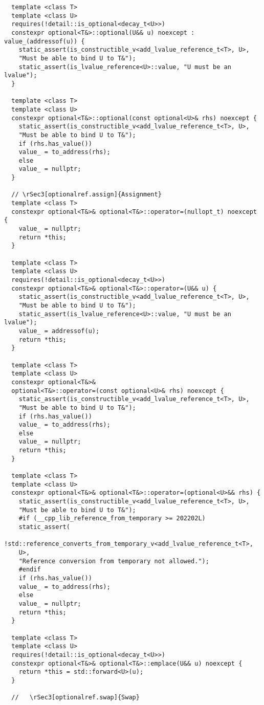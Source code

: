\documentclass[a4paper,10pt,oneside,openany,final,article]{memoir}
\begin{document}
\begin{verbatim}
  template <class T>
  template <class U>
  requires(!detail::is_optional<decay_t<U>>)
  constexpr optional<T&>::optional(U&& u) noexcept : value_(addressof(u)) {
    static_assert(is_constructible_v<add_lvalue_reference_t<T>, U>,
    "Must be able to bind U to T&");
    static_assert(is_lvalue_reference<U>::value, "U must be an lvalue");
  }

  template <class T>
  template <class U>
  constexpr optional<T&>::optional(const optional<U>& rhs) noexcept {
    static_assert(is_constructible_v<add_lvalue_reference_t<T>, U>,
    "Must be able to bind U to T&");
    if (rhs.has_value())
    value_ = to_address(rhs);
    else
    value_ = nullptr;
  }

  // \rSec3[optionalref.assign]{Assignment}
  template <class T>
  constexpr optional<T&>& optional<T&>::operator=(nullopt_t) noexcept {
    value_ = nullptr;
    return *this;
  }

  template <class T>
  template <class U>
  requires(!detail::is_optional<decay_t<U>>)
  constexpr optional<T&>& optional<T&>::operator=(U&& u) {
    static_assert(is_constructible_v<add_lvalue_reference_t<T>, U>,
    "Must be able to bind U to T&");
    static_assert(is_lvalue_reference<U>::value, "U must be an lvalue");
    value_ = addressof(u);
    return *this;
  }

  template <class T>
  template <class U>
  constexpr optional<T&>&
  optional<T&>::operator=(const optional<U>& rhs) noexcept {
    static_assert(is_constructible_v<add_lvalue_reference_t<T>, U>,
    "Must be able to bind U to T&");
    if (rhs.has_value())
    value_ = to_address(rhs);
    else
    value_ = nullptr;
    return *this;
  }

  template <class T>
  template <class U>
  constexpr optional<T&>& optional<T&>::operator=(optional<U>&& rhs) {
    static_assert(is_constructible_v<add_lvalue_reference_t<T>, U>,
    "Must be able to bind U to T&");
    #if (__cpp_lib_reference_from_temporary >= 202202L)
    static_assert(
    !std::reference_converts_from_temporary_v<add_lvalue_reference_t<T>,
    U>,
    "Reference conversion from temporary not allowed.");
    #endif
    if (rhs.has_value())
    value_ = to_address(rhs);
    else
    value_ = nullptr;
    return *this;
  }

  template <class T>
  template <class U>
  requires(!detail::is_optional<decay_t<U>>)
  constexpr optional<T&>& optional<T&>::emplace(U&& u) noexcept {
    return *this = std::forward<U>(u);
  }

  //   \rSec3[optionalref.swap]{Swap}


\end{verbatim}
\end{document}
